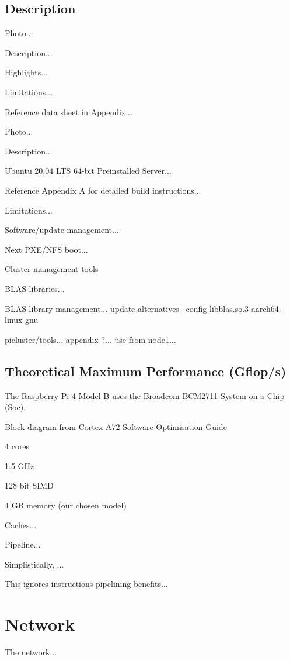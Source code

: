 \documentclass{report}
\begin{document}
\subsection{Description}

Photo...

Description...

Highlights...

Limitations...

Reference data sheet in Appendix...

Photo...

Description...

Ubuntu 20.04 LTS 64-bit Preinstalled Server...

Reference Appendix A for detailed build instructions...

Limitations...

Software/update management...

Next PXE/NFS boot...

Cluster management tools

BLAS libraries...

BLAS library management... update-alternatives --config libblas.so.3-aarch64-linux-gnu

picluster/tools... appendix ?... use from node1...


\subsection{Theoretical Maximum Performance (Gflop/s)}

The Raspberry Pi 4 Model B uses the Broadcom BCM2711 System on a Chip (Soc).

Block diagram from Cortex-A72 Software Optimisation Guide

4 cores

1.5 GHz

128 bit SIMD

4 GB memory (our chosen model)

Caches...

Pipeline...

Simplistically, ...

This ignores instructions pipelining benefits...


%
%
\section{Network}

The network...


%
%
\end{document}
